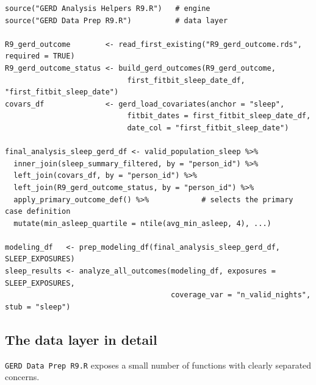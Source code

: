 \documentclass[11pt]{article}
\newcommand{\code}[1]{\texttt{\small #1}}
\begin{document}
\begin{lstlisting}[caption={The essential structure of every driver.}]
source("GERD Analysis Helpers R9.R")   # engine
source("GERD Data Prep R9.R")          # data layer

R9_gerd_outcome        <- read_first_existing("R9_gerd_outcome.rds", required = TRUE)
R9_gerd_outcome_status <- build_gerd_outcomes(R9_gerd_outcome,
                            first_fitbit_sleep_date_df, "first_fitbit_sleep_date")
covars_df              <- gerd_load_covariates(anchor = "sleep",
                            fitbit_dates = first_fitbit_sleep_date_df,
                            date_col = "first_fitbit_sleep_date")

final_analysis_sleep_gerd_df <- valid_population_sleep %>%
  inner_join(sleep_summary_filtered, by = "person_id") %>%
  left_join(covars_df, by = "person_id") %>%
  left_join(R9_gerd_outcome_status, by = "person_id") %>%
  apply_primary_outcome_def() %>%            # selects the primary case definition
  mutate(min_asleep_quartile = ntile(avg_min_asleep, 4), ...)

modeling_df   <- prep_modeling_df(final_analysis_sleep_gerd_df, SLEEP_EXPOSURES)
sleep_results <- analyze_all_outcomes(modeling_df, exposures = SLEEP_EXPOSURES,
                                      coverage_var = "n_valid_nights", stub = "sleep")
\end{lstlisting}

\subsection{The data layer in detail}
\code{GERD Data Prep R9.R} exposes a small number of functions with clearly separated concerns.
\end{document}
